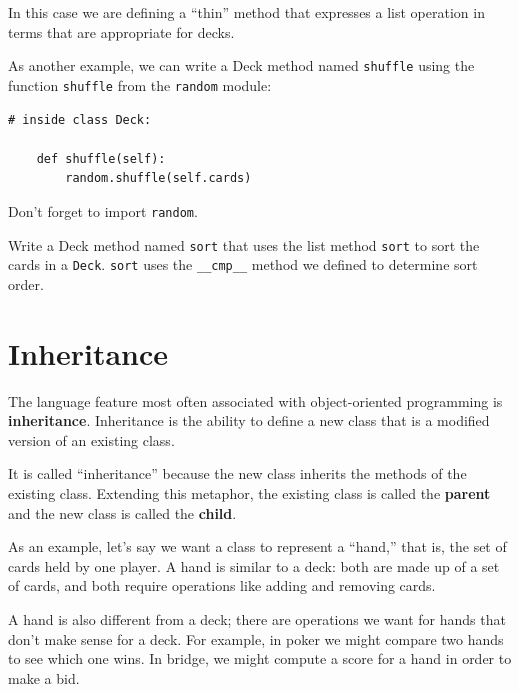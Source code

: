 \documentclass[10pt]{book}
\begin{document}
{

In this case we are defining a ``thin'' method that expresses
a list operation in terms that are appropriate for decks.

As another example, we can write a Deck method named {\tt shuffle}
using the function {\tt shuffle} from the {\tt random} module:


\beforeverb
\begin{verbatim}
# inside class Deck:
            
    def shuffle(self):
        random.shuffle(self.cards)
\end{verbatim}
\afterverb
%
Don't forget to import {\tt random}.

\begin{ex}

Write a Deck method named {\tt sort} that uses the list method
{\tt sort} to sort the cards in a {\tt Deck}.  {\tt sort} uses
the \verb"__cmp__" method we defined to determine sort order.
\end{ex}



\section{Inheritance}


The language feature most often associated with object-oriented
programming is {\bf inheritance}.  Inheritance is the ability to
define a new class that is a modified version of an existing
class.


It is called ``inheritance'' because the new class inherits the
methods of the existing class.  Extending this metaphor, the existing
class is called the {\bf parent} and the new class is
called the {\bf child}.

As an example, let's say we want a class to represent a ``hand,''
that is, the set of cards held by one player.  A hand is similar to a
deck: both are made up of a set of cards, and both require operations
like adding and removing cards.

A hand is also different from a deck; there are operations we want for
hands that don't make sense for a deck.  For example, in poker we
might compare two hands to see which one wins.  In bridge, we might
compute a score for a hand in order to make a bid.

}
\end{document}
